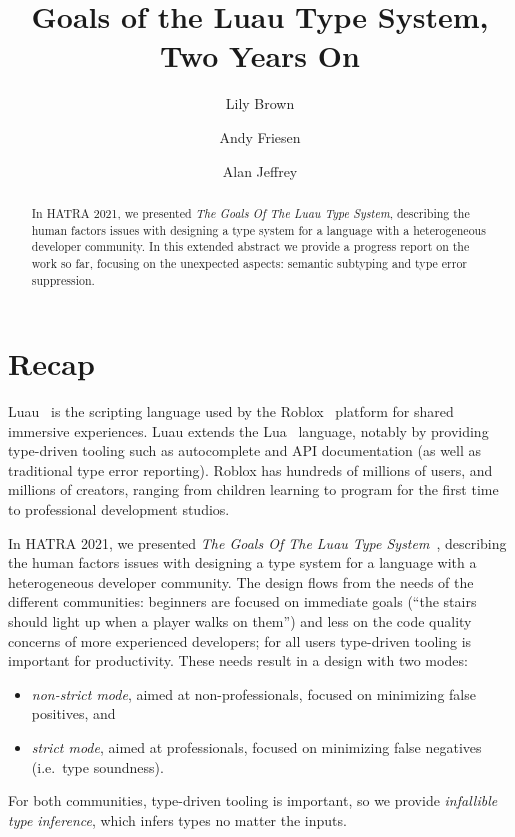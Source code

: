 \documentclass[acmsmall]{acmart}
\begin{document}
\title{Goals of the Luau Type System, Two Years On}

\author{Lily Brown}
\author{Andy Friesen}
\author{Alan Jeffrey}

\begin{abstract}
In HATRA 2021, we presented \emph{The Goals Of The Luau Type System},
describing the human factors issues with designing a type system for a
language with a heterogeneous developer community. In this extended
abstract we provide a progress report on the work so far, focusing on
the unexpected aspects: semantic subtyping and type error
suppression.
\end{abstract}

\maketitle

\section{Recap}

Luau~\cite{Luau} is the scripting language used by the
Roblox~\cite{Roblox} platform for shared immersive experiences.  Luau extends
the Lua~\cite{Lua} language, notably by providing type-driven tooling
such as autocomplete and API documentation (as well as traditional type
error reporting). Roblox has hundreds of millions of users, and
millions of creators, ranging from children learning to program for
the first time to professional development studios.

In HATRA 2021, we presented \emph{The Goals Of The Luau Type
System}~\cite{BFJ21:GoalsLuau}, describing the human factors issues
with designing a type system for a language with a heterogeneous
developer community. The design flows from the needs of the different
communities: beginners are focused on immediate goals (``the stairs
should light up when a player walks on them'') and less on the code
quality concerns of more experienced developers; for all users
type-driven tooling is important for productivity. These needs result in a design with two modes:
\begin{itemize}
\item \emph{non-strict mode}, aimed at non-professionals, focused on
  minimizing false positives, and
\item \emph{strict mode}, aimed at professionals, focused on
  minimizing false negatives (i.e.~type soundness).
\end{itemize}
For both communities, type-driven tooling is important, so we
provide \emph{infallible type inference}, which infers types no matter 
the inputs.
\end{document}
